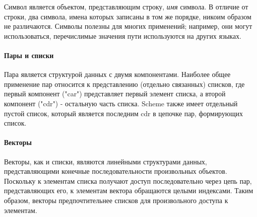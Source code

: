 Символ является объектом, представляющим строку, \textit{имя} символа. В отличие от строки, два символа,
имена которых записаны в том же порядке, никоим образом не различаются. Символы полезны для
многих применений; например, они могут использоваться, перечислимые значения пути
используются на других языках.

\paragraph{Пары и списки}

Пара является структурой данных с двумя компонентами. Наиболее общее применение пар относится
к представлению (отдельно связанных) списков, где первый компонент ("car") представляет первый
элемент списка, а второй компонент ("cdr") - остальную часть списка. Scheme также имеет
отдельный пустой список, который является последним cdr в цепочке пар, формирующих
список.

\paragraph{Векторы}

Векторы, как и списки, являются линейными структурами данных, представляющими конечные
последовательности произвольных объектов. Поскольку к элементам списка получают
доступ последовательно через цепь пар, представляющих его, к элементам вектора обращаются
целыми индексами. Таким образом, векторы предпочтительнее списков для
произвольного доступа к элементам.


